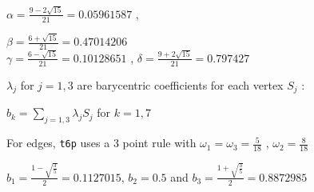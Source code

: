      $ \alpha =  \frac{9 - 2 \sqrt{15}} { 21 } = 0.05961587 $ ,
      \begin{large}
       $ \beta =  \frac {6 + \sqrt{15}} { 21 } = 0.47014206 $  \\
       $\gamma =  \frac {6 - \sqrt{15}} { 21 } = 0.10128651 $ , 
       $ \delta = \frac {9 + 2  \sqrt{15}}  { 21 } = 0.797427 $
      \end{large}

$\lambda_j$ for $j=1,3$ are barycentric coefficients for each vertex $S_j$ :

$b_k=\sum_{j=1,3}\lambda_j S_j$ for $k=1,7$


For edges,  {\tt t6p} uses a 3 point rule with
$\omega_1 = \omega_3 = \frac{5}{18}$ , $ \omega_2 =  \frac{8}{18}$

$b_1 = \frac{1- \sqrt{\frac{3}{5}}}  {2 } = 0.1127015 $, $ b_2 = 0.5 $ and   
            $b_3 = \frac {1 +  \sqrt{ \frac{3}{5}  }} { 2 } = 0.8872985 $ 



















